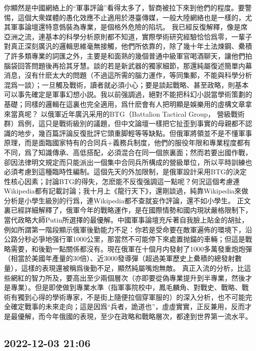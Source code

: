 \documentclass[twocolumn]{ctexart}
\begin{document}
你顯然是中國網絡上的“軍事評論”看得太多了，智商被拉下來到他們的程度。要警惕，這個大衆媒體的愚化效應不止適用於港臺傳媒，一般大陸網絡也是一樣的，尤其軍事論壇還特意僞裝為專業，是個格外危險的陷坑。
我已經反復解釋，像是席亞洲之流，連基本的科學分析原則都不知道，實際學術研究經驗恰恰爲零，一輩子對真正深刻廣汎的邏輯思維毫無接觸，他們所依靠的，除了幾十年土法煉鋼、纍積了許多類專業的詞匯之外，主要是和面熟的幾個普通中級軍官喝酒聊天，讓他們拍腦袋回答問題後再拾其牙慧。談的若是新武器的獨家細節，那還純屬復述簡單内幕消息，沒有什麽太大的問題（不過這所需的腦力運作，等同集郵，不能與科學分析混爲一談）；一旦觸及戰術，讀者就必須小心；要是談起戰略、甚至政略，則基本可以事先確定是軍事幻想小説。我以前强調過，絕對不能把科幻小説當學術策劃的基礎；同樣的邏輯在這裏也完全適用，爲什麽會有人把明顯是娛樂用的虛構文章拿來當真呢？
以俄軍近年廣汎采用的BTG（Battalion Tactical Group， 營級戰術群）爲例，這只是戰術級別的議題，但中文論壇一樣把它扯歪到事實的母親都不認識的地步，幾百篇評論反復批評它頭重脚輕等等缺點。但俄軍將領並不是不懂軍事原理，而是面臨國家特有的合同兵+義務兵制度，他們的服役年限和專業程度都有不同，爲了知識傳承、高低搭配，必須混合在同一個旅裏面；然而若要出國作戰，卻因法律明文規定而只能派出一個集中合同兵所構成的營級單位，所以平時訓練也必須考慮到這種臨時性編制。這個先天的外加限制，是俄軍設計采用BTG的決定性核心因素；討論BTG的得失，怎麽能不反復强調這一點呢？何況這個考慮連Wikipedia都有記載討論；我十月上《龍行天下》，還剛談過，純靠Wikipedia來做分析是小學生級別的行爲，連Wikipedia都不查就妄作評論，還不如小學生。
正文裏已經詳細解釋了，俄軍今年的戰略運作，是在國際情勢和國内現狀嚴格限制下，當代政略大師Putin所選擇的最優解。中國軍事論壇充斥著自我臉上貼金的胡扯，例如所謂第一階段顯示俄軍後勤能力不足：你若是受命要在敵軍遍佈的環境下，沿公路分秒必爭地强行軍1000公里，那當然不可能停下來處置抛錨的車輛；但這是戰略需要，和後勤一點關係都沒有。現在俄軍在十個月内發射了1000多萬發重炮炮彈（相當於美國年產量的30倍）、近3000發導彈（超過美軍歷史上纍積的總發射數量），這樣的表現還被稱爲後勤不足，顯然純屬嘴炮無敵。
真正入流的分析，比這些網紅的智力所及，要高出至少兩個層次（亦即要從偽專業提升到半專業，然後才是專業）。但是即使做到專業水準（指軍事院校中，鳳毛麟角、對戰史、戰略、戰術有獨到心得的學術專家，不是街上隨便拉個穿軍服的）的深入分析，也不可能完全確定戰事的未來走向；這是因爲“兵者，詭道也”，虛虛實實，正反兼用，反而才是最優解，而今年俄國的表現，至少在政略和戰略層次，都達到世界第一流水平。
\subsection*{2022-12-03 21:06}
\end{document}
